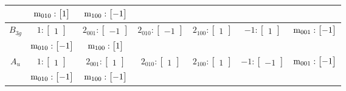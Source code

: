 \documentclass[fleqn,8pt,landscape]{jsarticle}
\begin{document}
\begin{longtable}{ccccccc}
& $ {\rm m}_{010}:\begin{bmatrix} 1 \end{bmatrix} $ & $ {\rm m}_{100}:\begin{bmatrix} -1 \end{bmatrix} $ & $  $ & $  $ & $  $ & $  $ \\ \hline
$ B_{3g} $ & $ 1:\begin{bmatrix} 1 \end{bmatrix} $ & $ 2{}_{001}:\begin{bmatrix} -1 \end{bmatrix} $ & $ 2{}_{010}:\begin{bmatrix} -1 \end{bmatrix} $ & $ 2{}_{100}:\begin{bmatrix} 1 \end{bmatrix} $ & $ -1:\begin{bmatrix} 1 \end{bmatrix} $ & $ {\rm m}_{001}:\begin{bmatrix} -1 \end{bmatrix} $ \\
& $ {\rm m}_{010}:\begin{bmatrix} -1 \end{bmatrix} $ & $ {\rm m}_{100}:\begin{bmatrix} 1 \end{bmatrix} $ & $  $ & $  $ & $  $ & $  $ \\ \hline
$ A_{u} $ & $ 1:\begin{bmatrix} 1 \end{bmatrix} $ & $ 2{}_{001}:\begin{bmatrix} 1 \end{bmatrix} $ & $ 2{}_{010}:\begin{bmatrix} 1 \end{bmatrix} $ & $ 2{}_{100}:\begin{bmatrix} 1 \end{bmatrix} $ & $ -1:\begin{bmatrix} -1 \end{bmatrix} $ & $ {\rm m}_{001}:\begin{bmatrix} -1 \end{bmatrix} $ \\
& $ {\rm m}_{010}:\begin{bmatrix} -1 \end{bmatrix} $ & $ {\rm m}_{100}:\begin{bmatrix} -1 \end{bmatrix} $ & $  $ & $  $ & $  $ & $  $ \\ \hline

\end{longtable}
\end{document}
